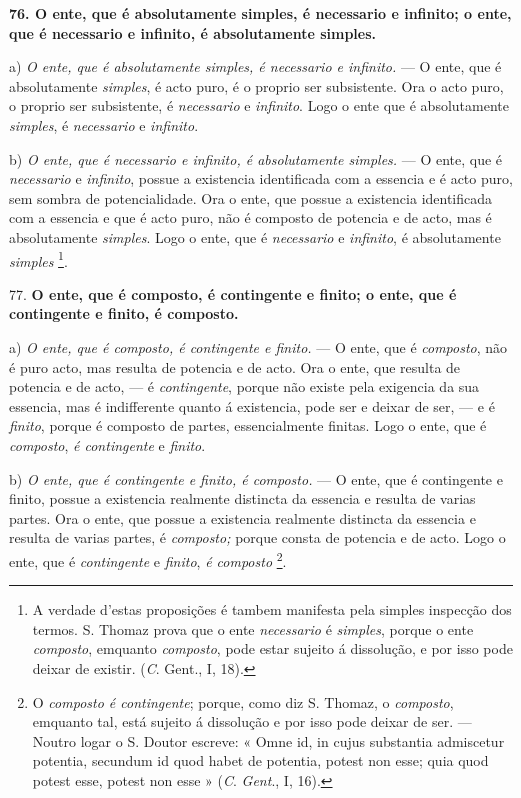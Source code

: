 \textbf{76. O ente, que é absolutamente simples, é necessario e infinito; o ente, que é necessario e infinito, é absolutamente simples.}

a) \emph{O ente, que é absolutamente simples, é necessario e infinito.} --- O ente, que é absolutamente \emph{simples}, é acto puro, é o proprio ser subsistente. Ora o acto puro, o proprio ser subsistente, é \emph{necessario} e \emph{infinito}. Logo o ente que é absolutamente \emph{simples}, é \emph{necessario} e \emph{infinito}.

b) \emph{O ente, que é necessario e infinito, é absolutamente simples.} --- O ente, que é \emph{necessario} e \emph{infinito}, possue a existencia  identificada com a essencia e é acto puro, sem sombra de potencialidade. Ora o ente, que possue a existencia identificada com a essencia e que é acto puro, não é composto de potencia e de acto, mas é absolutamente \emph{simples}. Logo o ente, que é \emph{necessario} e \emph{infinito}, é absolutamente \emph{simples} \footnote{A verdade d'estas proposições é tambem manifesta pela simples inspecção dos termos. S. Thomaz prova que o ente \emph{necessario} é \emph{simples}, porque o ente \emph{composto}, emquanto \emph{composto}, pode estar sujeito á dissolução, e por isso pode deixar de existir. (\emph{C}. Gent., I, 18).}.

77. \textbf{O ente, que é composto, é contingente e finito; o ente, que é contingente e finito, é composto.}

a) \emph{O ente, que é composto, é contingente e finito.} --- O ente, que é \emph{composto}, não é puro acto, mas resulta de potencia e de acto. Ora o ente, que resulta de potencia e de acto, --- é \emph{contingente}, porque não existe pela exigencia da sua essencia, mas é indifferente quanto á existencia, pode ser e deixar de ser, --- e é \emph{finito}, porque é composto de partes, essencialmente finitas. Logo o ente, que é \emph{composto}, \emph{é contingente} e \emph{finito}.

b) \emph{O ente, que é contingente e finito, é composto.} --- O ente, que é contingente e finito, possue a existencia realmente distincta da essencia e resulta de varias partes. Ora o ente, que possue a existencia realmente distincta da essencia e resulta de varias partes, é \emph{composto;} porque consta de potencia e de acto. Logo o ente, que é \emph{contingente} e \emph{finito}, \emph{é composto} \footnote{O \emph{composto é contingente}; porque, como diz S. Thomaz, o \emph{composto}, emquanto tal, está sujeito á dissolução e por isso pode deixar de ser. --- Noutro logar o S. Doutor escreve: « Omne id, in cujus substantia admiscetur potentia, secundum id quod habet de potentia, potest non esse; quia quod potest esse, potest non esse » (\emph{C}. \emph{Gent}., I, 16).}.

